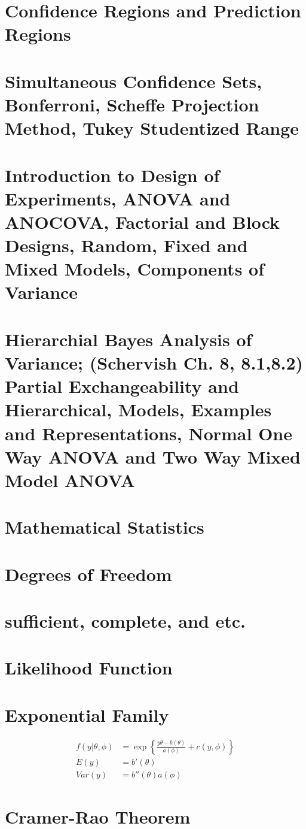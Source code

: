 \section{Confidence Regions and Prediction Regions}
\section{Simultaneous Confidence Sets, Bonferroni, Scheffe Projection Method, Tukey Studentized Range}
\section{Introduction to Design of Experiments, ANOVA and ANOCOVA, Factorial and Block Designs, Random, Fixed and Mixed Models, Components of Variance}
\section{Hierarchial Bayes Analysis of Variance; (Schervish Ch. 8, 8.1,8.2) Partial Exchangeability and Hierarchical, Models, Examples and Representations, Normal One Way ANOVA and Two Way Mixed Model ANOVA}

\section{Mathematical Statistics}
\section{Degrees of Freedom}
\section{sufficient, complete, and etc.}
\section{Likelihood Function}
\section{Exponential Family}
\begin{align}
	f(y|\theta,\phi) & = \exp \left\{ \frac{y\theta-b(\theta)}{a(\phi)}+c(y,\phi) \right\} \\
	E(y) & = b'(\theta) \\
	Var(y) & = b''(\theta)a(\phi)
\end{align}
\section{Cramer-Rao Theorem}

